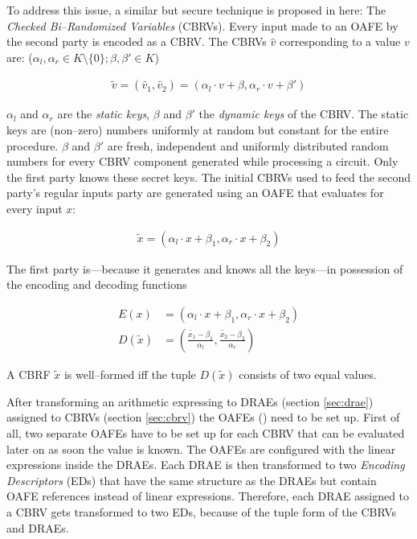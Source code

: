 To address this issue, a similar but secure technique is proposed in here: The
\emph{Checked Bi--Randomized Variables} (CBRVs). Every input made to an OAFE by
the second party is encoded as a CBRV. The CBRVs $\hat{v}$ corresponding to a
value $v$ are: ($\alpha_l, \alpha_r \in K \setminus \{0\}; \beta, \beta' \in K$)

\begin{align*}
  \widetilde{v} = (\widetilde{v_1}, \widetilde{v_2}) =
  (\alpha_l \cdot v + \beta, \alpha_r \cdot v + \beta')
\end{align*}

\noindent{} $\alpha_l$ and $\alpha_r$ are the \emph{static keys}, $\beta$ and
$\beta'$ the \emph{dynamic keys} of the CBRV. The static keys are (non--zero)
numbers uniformly at random but constant for the entire procedure. $\beta$ and
$\beta'$ are fresh, independent and uniformly distributed random numbers for
every CBRV component generated while processing a circuit. Only the first party
knows these secret keys. The initial CBRVs used to feed the second party's
regular inputs party are generated using an OAFE that evaluates for every input
$x$:

\begin{align*}
  \widetilde{x} = (\alpha_l \cdot x + \beta_1, \alpha_r \cdot x + \beta_2)
\end{align*}

The first party is---because it generates and knows all the keys---in possession
of the encoding and decoding functions

\begin{align*}
  E(x) &= \left(\alpha_l \cdot x + \beta_1, \alpha_r \cdot x + \beta_2\right) \\
  D(\widetilde{x}) &= \left(\frac{\widetilde{x_1} - \beta_1}{\alpha_l},
                       \frac{\widetilde{x_2} - \beta_2}{\alpha_r}\right)
\end{align*}

A CBRF $\widetilde{x}$ is well--formed iff the tuple $D(\widetilde{x})$ consists
of two equal values.




%
%
\label{sec:prep-eval}

After transforming an arithmetic expressing to DRAEs (section \ref{sec:drae})
assigned to CBRVs (section \ref{sec:cbrv}) the OAFEs (\cite{davidgoliath}) need
to be set up. First of all, two separate OAFEs have to be set up for each CBRV
that can be evaluated later on as soon the value is known. The OAFEs are
configured with the linear expressions inside the DRAEs. Each DRAE is then
transformed to two \emph{Encoding Descriptors} (EDs) that have the same
structure as the DRAEs but contain OAFE references instead of linear
expressions. Therefore, each DRAE assigned to a CBRV gets transformed to two
EDs, because of the tuple form of the CBRVs and DRAEs.


